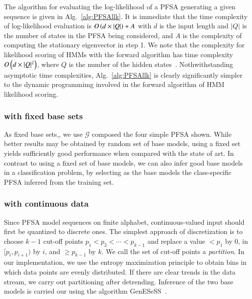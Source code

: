 \documentclass[9pt,journal]{IEEEtran}
\begin{document}
{   The algorithm for evaluating the log-likelihood of a PFSA generating a given sequence is given in Alg.~\ref{alg:PFSAllk}.    It is immediate that the time complexity of log-likelihood evaluation is  $O\left( d\times|Q| \right)+A$ with $d$ is the input length   and $|Q|$ is the number of states in the PFSA being considered, and $A$ is the complexity of computing the stationary eigenvector in step 1.	We note that the complexity for likelihood scoring of HMMs with the forward algorithm  has time complexity $O\left( d\times|Q|^2 \right)$, where $Q$ is the number of the hidden states~\cite{rabiner1989tutorial}. Nothwithstanding asymptotic time complexities, Alg.~\ref{alg:PFSAllk} is clearly significantly simpler to the dynamic programmimg involved in the forward algorithm of HMM likelihood scoring.
 
 \subsubsection{\ALGONAME with fixed base sets}
As fixed base sets,,  we use $\mathcal{G}$ composed the four simple PFSA shown. While better results may be obtained by random set of base models, using a fixed set yields sufficiently good performance when compared with the state of art.  In contrast  to using a fixed set of base models, we can also infer good base models in a classification problem, by selecting as the base models the class-specific PFSA inferred from the training set. %
   \subsubsection{\ALGONAME with continuous data}
   Since PFSA model sequences on finite alphabet, continuous-valued input should first be quantized to discrete ones. The simplest approach of discretization is to choose $k-1$ cut-off points $p_1 < p_2 < \cdots <p_{k-1}$ and replace a value $<p_1$ by $0$, in $[p_i, p_{i+1})$ by $i$, and $\geq p_{k-1}$ by $k$. We call the set of cut-off points a \emph{partition}. In our implementation, we use the  entropy maximization principle  to obtain bins in which data points are evenly distributed. If there are clear trends in the data stream, we carry out partitioning after detrending. Inference of the two base models is carried our  using the algorithm \textsf{GenESeSS}~\cite{chattopadhyay2013abductive}.

}
\end{document}
